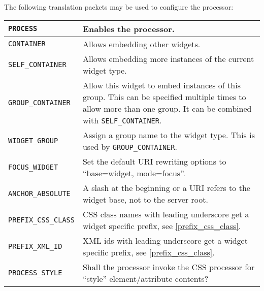 \documentclass[a4paper,12pt]{article}
\begin{document}
The following translation packets may be used to configure the
processor:

\begin{longtable}{|l|p{8cm}|}
\hline

\verb|PROCESS| & Enables the processor. \\

\hline

\verb|CONTAINER| & Allows embedding other widgets. \\

\hline

\verb|SELF_CONTAINER| & Allows embedding more instances of the current
widget type. \\

\hline

\verb|GROUP_CONTAINER| & Allow this widget to embed instances of this
group.  This can be specified multiple times to allow more than one
group.  It can be combined with \verb|SELF_CONTAINER|. \\

\hline

\verb|WIDGET_GROUP| & Assign a group name to the widget type.  This is
used by \verb|GROUP_CONTAINER|. \\

\hline

\texttt{FOCUS\_WIDGET} & Set the default URI rewriting options to
``base=widget, mode=focus''. \\

\hline

\verb|ANCHOR_ABSOLUTE| & A slash at the beginning or a URI refers to
the widget base, not to the server root. \\

\hline

\verb|PREFIX_CSS_CLASS| & CSS class names with leading underscore
get a widget specific prefix, see \ref{prefix_css_class}. \\

\hline

\verb|PREFIX_XML_ID| & XML ids with leading underscore get a widget
specific prefix, see \ref{prefix_css_class}. \\

\hline

\verb|PROCESS_STYLE| & Shall the processor invoke the CSS processor
for ``style'' element/attribute contents? \\

\hline
\end{longtable}
\end{document}
